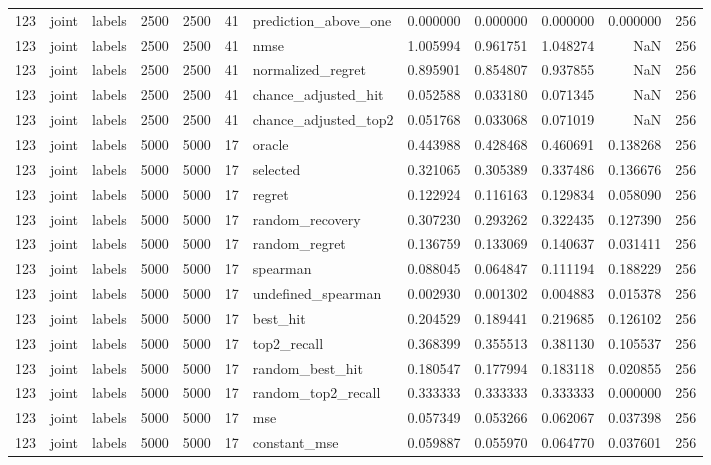 \begin{tabular}{rllrrrlrrrrr}
123 & joint & labels & 2500 & 2500 & 41 & prediction_above_one & 0.000000 & 0.000000 & 0.000000 & 0.000000 & 256 \\
123 & joint & labels & 2500 & 2500 & 41 & nmse & 1.005994 & 0.961751 & 1.048274 & NaN & 256 \\
123 & joint & labels & 2500 & 2500 & 41 & normalized_regret & 0.895901 & 0.854807 & 0.937855 & NaN & 256 \\
123 & joint & labels & 2500 & 2500 & 41 & chance_adjusted_hit & 0.052588 & 0.033180 & 0.071345 & NaN & 256 \\
123 & joint & labels & 2500 & 2500 & 41 & chance_adjusted_top2 & 0.051768 & 0.033068 & 0.071019 & NaN & 256 \\
123 & joint & labels & 5000 & 5000 & 17 & oracle & 0.443988 & 0.428468 & 0.460691 & 0.138268 & 256 \\
123 & joint & labels & 5000 & 5000 & 17 & selected & 0.321065 & 0.305389 & 0.337486 & 0.136676 & 256 \\
123 & joint & labels & 5000 & 5000 & 17 & regret & 0.122924 & 0.116163 & 0.129834 & 0.058090 & 256 \\
123 & joint & labels & 5000 & 5000 & 17 & random_recovery & 0.307230 & 0.293262 & 0.322435 & 0.127390 & 256 \\
123 & joint & labels & 5000 & 5000 & 17 & random_regret & 0.136759 & 0.133069 & 0.140637 & 0.031411 & 256 \\
123 & joint & labels & 5000 & 5000 & 17 & spearman & 0.088045 & 0.064847 & 0.111194 & 0.188229 & 256 \\
123 & joint & labels & 5000 & 5000 & 17 & undefined_spearman & 0.002930 & 0.001302 & 0.004883 & 0.015378 & 256 \\
123 & joint & labels & 5000 & 5000 & 17 & best_hit & 0.204529 & 0.189441 & 0.219685 & 0.126102 & 256 \\
123 & joint & labels & 5000 & 5000 & 17 & top2_recall & 0.368399 & 0.355513 & 0.381130 & 0.105537 & 256 \\
123 & joint & labels & 5000 & 5000 & 17 & random_best_hit & 0.180547 & 0.177994 & 0.183118 & 0.020855 & 256 \\
123 & joint & labels & 5000 & 5000 & 17 & random_top2_recall & 0.333333 & 0.333333 & 0.333333 & 0.000000 & 256 \\
123 & joint & labels & 5000 & 5000 & 17 & mse & 0.057349 & 0.053266 & 0.062067 & 0.037398 & 256 \\
123 & joint & labels & 5000 & 5000 & 17 & constant_mse & 0.059887 & 0.055970 & 0.064770 & 0.037601 & 256 \\

\end{tabular}
